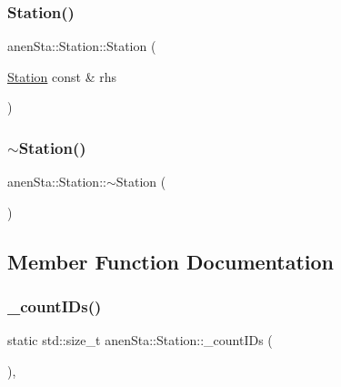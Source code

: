 \subsubsection{\texorpdfstring{Station()}{Station()}\hspace{0.1cm}{\footnotesize\ttfamily [4/4]}}
{\footnotesize\ttfamily anen\+Sta\+::\+Station\+::\+Station (\begin{DoxyParamCaption}\item[{\mbox{\hyperlink{classanen_sta_1_1_station}{Station}} const \&}]{rhs }\end{DoxyParamCaption})}

\mbox{\label{classanen_sta_1_1_station_a2825593117f648d73ea9cbaf851d709d}} 
\subsubsection{\texorpdfstring{$\sim$\+Station()}{~Station()}}
{\footnotesize\ttfamily anen\+Sta\+::\+Station\+::$\sim$\+Station (\begin{DoxyParamCaption}{ }\end{DoxyParamCaption})\hspace{0.3cm}{\ttfamily [virtual]}}



\subsection{Member Function Documentation}
\mbox{\label{classanen_sta_1_1_station_a6623cdce8748308c6d0e27ab4a111eb7}} 
\subsubsection{\texorpdfstring{\+\_\+count\+I\+Ds()}{\_countIDs()}}
{\footnotesize\ttfamily static std\+::size\+\_\+t anen\+Sta\+::\+Station\+::\+\_\+count\+I\+Ds (\begin{DoxyParamCaption}{ }\end{DoxyParamCaption})\hspace{0.3cm}{\ttfamily [inline]}, {\ttfamily [static]}}

